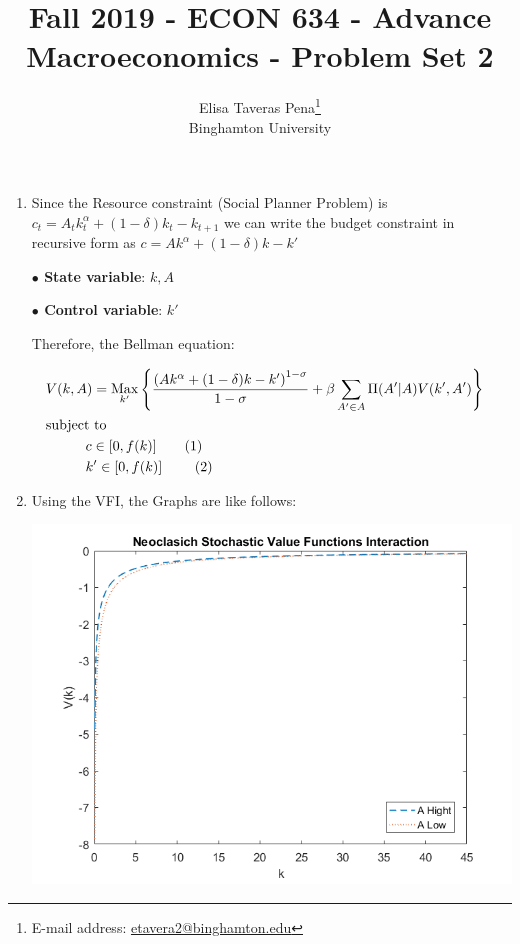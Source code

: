 \documentclass[12pt]{article}%
\newcommand\tab[1][1cm]{\hspace*{#1}}
\DeclareMathOperator*{\Max}{Max}
\newcommand\numberthis{\addtocounter{equation}{1}\tag{\theequation}}
\begin{document}
\title{Fall 2019 - ECON 634 - Advance Macroeconomics - Problem Set 2}
\author{Elisa Taveras Pena\footnote{E-mail address: \href{mailto:etavera2@binghamton.edu}{etavera2@binghamton.edu}  }\\
Binghamton University}
\maketitle

\sloppy%

\onehalfspacing

\begin{enumerate}
	\item 
	
	Since the Resource constraint (Social Planner Problem) is $c_t=A_tk_{t}^\alpha+(1-\delta)k_{t}-k_{t+1}$ we can write the budget constraint  in recursive form as  $c=Ak^\alpha+(1-\delta)k-k'$ 
	
	\tab \textbf{ $\bullet$ State variable}: $k,A$ 
	
	\tab \textbf{ $\bullet$ Control variable}: $k'$
	
	
	
	Therefore, the Bellman equation:
	
	\begin{align*}
	&V(k,A)=\Max_{k'} \left\lbrace \frac{\left( Ak^\alpha+(1-\delta)k-k'\right) ^{1-\sigma}}{1-\sigma}+ \beta \sum_{A' \in A} \Pi(A'|A)V(k',A')\right\rbrace 
	& \notag \\
	&\text{subject to} \notag \\
	& \tab c \in [0,f(k)] \numberthis\\
	& \tab k' \in [0,f(k)] \ \numberthis\\
	\end{align*} 
	
	\item Using the VFI, the Graphs are like follows:
	
	\begin{center}
		\includegraphics[width=1\linewidth]{VF}
	\end{center}
	

\end{enumerate}
\end{document}
